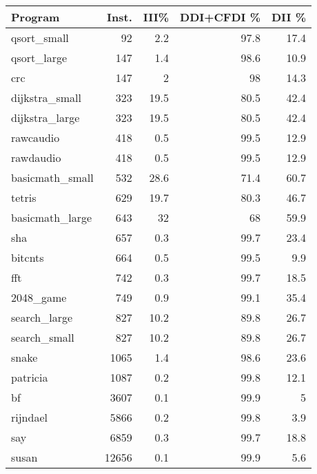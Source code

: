 \begin{tabular}{|l|r|r|r|r|}
\hline
 Program         &   Inst. &   III\% &   DDI+CFDI \% &   DII \% \\
\hline
 qsort\_small     &      92 &    2.2 &         97.8 &    17.4 \\
\hline
 qsort\_large     &     147 &    1.4 &         98.6 &    10.9 \\
\hline
 crc             &     147 &    2   &         98   &    14.3 \\
\hline
 dijkstra\_small  &     323 &   19.5 &         80.5 &    42.4 \\
\hline
 dijkstra\_large  &     323 &   19.5 &         80.5 &    42.4 \\
\hline
 rawcaudio       &     418 &    0.5 &         99.5 &    12.9 \\
\hline
 rawdaudio       &     418 &    0.5 &         99.5 &    12.9 \\
\hline
 basicmath\_small &     532 &   28.6 &         71.4 &    60.7 \\
\hline
 tetris          &     629 &   19.7 &         80.3 &    46.7 \\
\hline
 basicmath\_large &     643 &   32   &         68   &    59.9 \\
\hline
 sha             &     657 &    0.3 &         99.7 &    23.4 \\
\hline
 bitcnts         &     664 &    0.5 &         99.5 &     9.9 \\
\hline
 fft             &     742 &    0.3 &         99.7 &    18.5 \\
\hline
 2048\_game       &     749 &    0.9 &         99.1 &    35.4 \\
\hline
 search\_large    &     827 &   10.2 &         89.8 &    26.7 \\
\hline
 search\_small    &     827 &   10.2 &         89.8 &    26.7 \\
\hline
 snake           &    1065 &    1.4 &         98.6 &    23.6 \\
\hline
 patricia        &    1087 &    0.2 &         99.8 &    12.1 \\
\hline
 bf              &    3607 &    0.1 &         99.9 &     5   \\
\hline
 rijndael        &    5866 &    0.2 &         99.8 &     3.9 \\
\hline
 say             &    6859 &    0.3 &         99.7 &    18.8 \\
\hline
 susan           &   12656 &    0.1 &         99.9 &     5.6 \\

\end{tabular}
